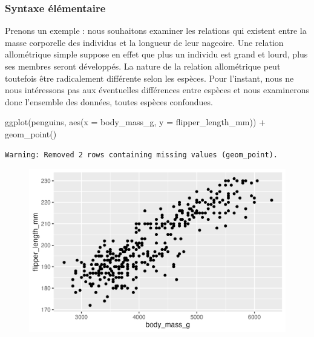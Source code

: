 \documentclass[
  letterpaper,
  DIV=11,
  numbers=noendperiod]{scrreprt}
\newenvironment{Shaded}{\begin{snugshade}}{\end{snugshade}}
\newcommand{\AttributeTok}[1]{\textcolor[rgb]{0.40,0.45,0.13}{#1}}
\newcommand{\FunctionTok}[1]{\textcolor[rgb]{0.28,0.35,0.67}{#1}}
\newcommand{\NormalTok}[1]{\textcolor[rgb]{0.00,0.23,0.31}{#1}}
\newcommand{\SpecialCharTok}[1]{\textcolor[rgb]{0.37,0.37,0.37}{#1}}
\begin{document}
\hypertarget{syntaxe-uxe9luxe9mentaire-1}{%
\subsubsection{Syntaxe élémentaire}\label{syntaxe-uxe9luxe9mentaire-1}}

Prenons un exemple : nous souhaitons examiner les relations qui existent
entre la masse corporelle des individus et la longueur de leur nageoire.
Une relation allométrique simple suppose en effet que plus un individu
est grand et lourd, plus ses membres seront développés. La nature de la
relation allométrique peut toutefois être radicalement différente selon
les espèces. Pour l'instant, nous ne nous intéressons pas aux
éventuelles différences entre espèces et nous examinerons donc
l'ensemble des données, toutes espèces confondues.

\begin{Shaded}
\begin{Highlighting}[]
\FunctionTok{ggplot}\NormalTok{(penguins, }\FunctionTok{aes}\NormalTok{(}\AttributeTok{x =}\NormalTok{ body\_mass\_g, }\AttributeTok{y =}\NormalTok{ flipper\_length\_mm)) }\SpecialCharTok{+}
  \FunctionTok{geom\_point}\NormalTok{()}
\end{Highlighting}
\end{Shaded}

\begin{verbatim}
Warning: Removed 2 rows containing missing values (geom_point).
\end{verbatim}

\begin{figure}[H]

{\centering \includegraphics{./03-visualization_files/figure-pdf/unnamed-chunk-47-1.png}

}

\end{figure}
\end{document}
